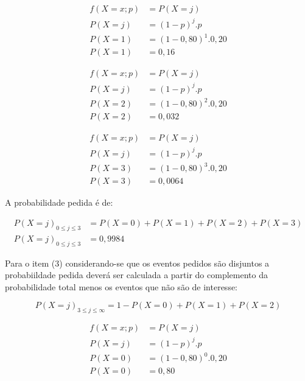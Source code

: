 \documentclass[
]{book}
\begin{document}
\hfill\break

\begin{align*}
f(X=x; p) & =  P(X=j) \\
P(X=j) & =  (1-p)^{j} . p \\
P(X=1) & =  (1-0,80)^{1} . 0,20 \\
P(X=1) & = 0,16
\end{align*}

\hfill\break

\begin{align*}
f(X=x; p) & =   P(X=j) \\
P(X=j) & =  (1-p)^{j} . p \\
P(X=2) & =  (1-0,80)^{2} . 0,20 \\
P(X=2) & = 0,032
\end{align*}

\hfill\break

\begin{align*}
f(X=x; p) & =  P(X=j) \\
 P(X=j) & =  (1-p)^{j} . p \\
P(X=3) & =  (1-0,80)^{3} . 0,20 \\
P(X=3) & = 0,0064
\end{align*}

\hfill\break

A probabilidade pedida é de:

\begin{align*}
P(X=j)_{0 \le j \le 3} & = P(X=0) + P(X=1) + P(X=2) + P(X=3) \\
P(X=j)_{0 \le j \le 3} & =  0,9984
\end{align*}

\hfill\break

Para o item (3) considerando-se que os eventos pedidos são disjuntos a probabiildade pedida deverá ser calculada a partir do complemento da probabilidade total menos os eventos que não são de interesse:

\hfill\break

\[
P(X=j)_{3 \le j \le \infty} = 1 - P(X=0) + P(X=1) + P(X=2)
\]

\hfill\break

\begin{align*}
f(X=x; p) & =  P(X=j) \\
P(X=j) & = (1-p)^{j} . p \\
P(X=0) & = (1-0,80)^{0} . 0,20 \\
P(X=0) & =  0,80 
\end{align*}

\hfill\break
\end{document}
